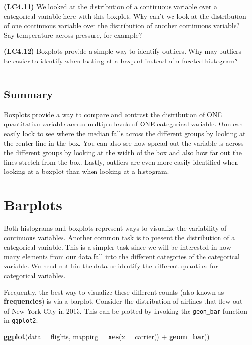 \documentclass[]{tufte-book}
\newenvironment{Shaded}{\begin{snugshade}}{\end{snugshade}}
\newcommand{\KeywordTok}[1]{\textcolor[rgb]{0.13,0.29,0.53}{\textbf{{#1}}}}
\newcommand{\DataTypeTok}[1]{\textcolor[rgb]{0.13,0.29,0.53}{{#1}}}
\newcommand{\StringTok}[1]{\textcolor[rgb]{0.31,0.60,0.02}{{#1}}}
\newcommand{\NormalTok}[1]{{#1}}
\begin{document}
\textbf{(LC4.11)} We looked at the distribution of a continuous variable
over a categorical variable here with this boxplot. Why can't we look at
the distribution of one continuous variable over the distribution of
another continuous variable? Say temperature across pressure, for
example?

\textbf{(LC4.12)} Boxplots provide a simple way to identify outliers.
Why may outliers be easier to identify when looking at a boxplot instead
of a faceted histogram?

\begin{center}\rule{0.5\linewidth}{\linethickness}\end{center}

\subsection{Summary}\label{summary-1}

Boxplots provide a way to compare and contrast the distribution of ONE
quantitative variable across multiple levels of ONE categorical
variable. One can easily look to see where the median falls across the
different groups by looking at the center line in the box. You can also
see how spread out the variable is across the different groups by
looking at the width of the box and also how far out the lines stretch
from the box. Lastly, outliers are even more easily identified when
looking at a boxplot than when looking at a histogram.

\section{Barplots}\label{barplots}

Both histograms and boxplots represent ways to visualize the variability
of continuous variables. Another common task is to present the
distribution of a categorical variable. This is a simpler task since we
will be interested in how many elements from our data fall into the
different categories of the categorical variable. We need not bin the
data or identify the different quantiles for categorical variables.

Frequently, the best way to visualize these different counts (also known
as \textbf{frequencies}) is via a barplot. Consider the distribution of
airlines that flew out of New York City in 2013. This can be plotted by
invoking the \texttt{geom\_bar} function in \texttt{ggplot2}:

\begin{Shaded}
\begin{Highlighting}[]
\KeywordTok{ggplot}\NormalTok{(}\DataTypeTok{data =} \NormalTok{flights, }\DataTypeTok{mapping =} \KeywordTok{aes}\NormalTok{(}\DataTypeTok{x =} \NormalTok{carrier)) +}
\StringTok{  }\KeywordTok{geom_bar}\NormalTok{()}
\end{Highlighting}
\end{Shaded}
\end{document}
